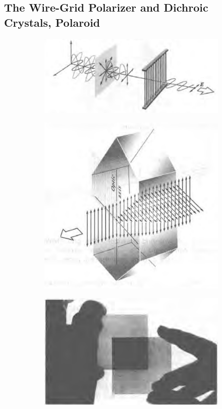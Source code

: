 \subsection{The Wire-Grid Polarizer and Dichroic Crystals, Polaroid}

\begin{figure}[H]
  \centering
  \begin{subfigure}{.4\textwidth}
    \centering
    \includegraphics[width=\linewidth]{figures/WireGrid}
    \label{fig:}
  \end{subfigure}
  \begin{subfigure}{.18\textwidth}
    \centering
    \includegraphics[width=\linewidth]{figures/Dichroic-Crystals}
    \label{fig:}
  \end{subfigure}
  \label{fig:}
  \begin{subfigure}{.4\textwidth}
    \centering
    \includegraphics[width=0.6\linewidth]{figures/Polaroid}
    \label{fig:}
  \end{subfigure}
  \label{fig:}
\end{figure}

